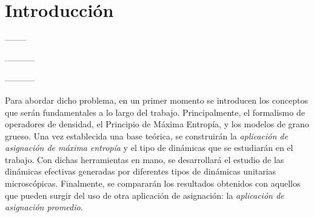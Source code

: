 \chapter{Introducción}



--------


-----------


-----------


Para abordar dicho problema, en un primer momento se introducen los conceptos que serán fundamentales a lo largo del trabajo. Principalmente, el formalismo de operadores de densidad, el Principio de Máxima Entropía, y los modelos de grano grueso. Una vez establecida una base teórica, se construirán la \textit{aplicación de asignación de máxima entropía} y el tipo de dinámicas que se estudiarán en el trabajo. Con dichas herramientas en mano, se desarrollará el estudio de las dinámicas efectivas generadas por diferentes tipos de dinámicas unitarias microscópicas. Finalmente, se compararán los resultados obtenidos con aquellos que pueden surgir del uso de otra aplicación de asignación: la \textit{aplicación de asignación promedio}.